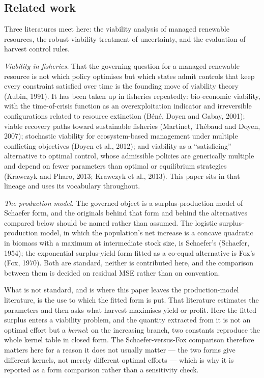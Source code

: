\documentclass[11pt]{article}
\begin{document}
\subsection{Related work}
\label{budget-priorart}

Three literatures meet here: the viability analysis of managed renewable resources, the
robust-viability treatment of uncertainty, and the evaluation of harvest control rules.

\textit{Viability in fisheries.} That the governing question for a managed renewable resource
is not which policy optimises but which states admit controls that keep every constraint
satisfied over time is the founding move of viability theory (Aubin, 1991). It has been taken
up in fisheries repeatedly: bio-economic viability, with the time-of-crisis function as an
overexploitation indicator and irreversible configurations related to resource extinction
(B\'en\'e, Doyen and Gabay, 2001); viable recovery paths toward sustainable fisheries
(Martinet, Th\'ebaud and Doyen, 2007); stochastic viability for ecosystem-based management
under multiple conflicting objectives (Doyen et al., 2012); and viability as a
``satisficing'' alternative to optimal control, whose admissible policies are generically
multiple and depend on fewer parameters than optimal or equilibrium strategies (Krawczyk and
Pharo, 2013; Krawczyk et al., 2013). This paper sits in that lineage and uses its vocabulary
throughout.

\textit{The production model.} The governed object is a surplus-production model of Schaefer
form, and the originals behind that form and behind the alternatives compared below should be
named rather than assumed. The logistic surplus-production model, in which the population's net
increase is a concave quadratic in biomass with a maximum at intermediate stock size, is
Schaefer's (Schaefer, 1954); the exponential surplus-yield form fitted as a co-equal
alternative is Fox's (Fox, 1970). Both are standard, neither is contributed here, and the
comparison between them is decided on residual MSE rather than on convention.

What is not standard, and is where this paper leaves the production-model literature, is the use
to which the fitted form is put. That literature estimates the parameters and then asks what
harvest maximises yield or profit. Here the fitted surplus enters a viability problem, and the
quantity extracted from it is not an optimal effort but a \emph{kernel}: on the increasing
branch, two constants reproduce the whole kernel table in closed form. The Schaefer-versus-Fox
comparison therefore matters here for a reason it does not usually matter --- the two forms give
different kernels, not merely different optimal efforts --- which is why it is reported as a
form comparison rather than a sensitivity check.
\end{document}
